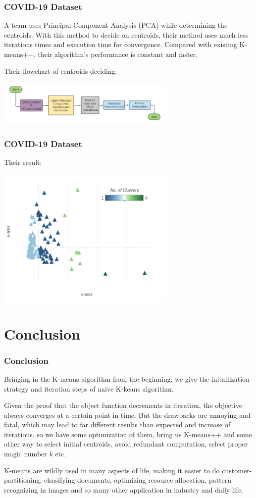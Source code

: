 \documentclass[9pt]{beamer}
\begin{document}
\begin{frame}
	\frametitle{COVID-19 Dataset}
A team uses Principal Component Analysis (PCA)  while determining the centroids. With this method to decide on centroids, their method uses much less iterations times and execution time for convergence. Compared with existing K-means++, their algorithm's performance is constant and faster. \par
Their flowchart of centroids deciding:
\centerline{\includegraphics[width=0.65\textwidth]{figures/COVID19.png}}



\end{frame}


\begin{frame}
	\frametitle{COVID-19 Dataset}
Their result:
\centerline{\includegraphics[width=0.65\textwidth]{figures/covidResult.png}}
\end{frame}

\section{Conclusion}
\begin{frame}
	\frametitle{Conclusion}
	Bringing in the K-means algorithm from the beginning, we give the initailization strategy and iteration steps of naive K-keans algorithm.
	\par Given the proof that the object function decrements in iteration, the objective always converges at a certain point in time. But the drawbacks are annoying and fatal, which may lead to far different results than expected and increase of iterations, so we have some optimization of them, bring us K-means++ and some other way to select initial centroids, avoid redundant computation, select proper magic number $k$ etc.
	\par K-means are wildly used in many aspects of life, making it easier to do customer-partitioning, clsasifying documents, optimizing resource allocation, pattern recognizing in images and so many other application in industry and daily life.
\end{frame}
\end{document}

